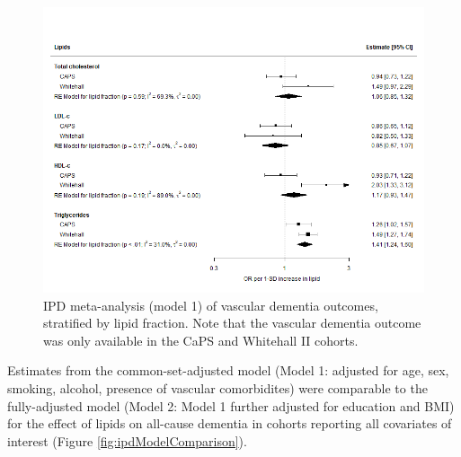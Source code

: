\documentclass[a4paper, twoside]{templates/ociamthesis}
\begin{document}
\begin{figure}[H]
\includegraphics[width=1\linewidth]{figures/ipd/main_vasdem} \caption[IPD meta-analysis of all-cause dementia, stratified by lipid fraction]{IPD meta-analysis (model 1) of vascular dementia outcomes, stratified by lipid fraction. Note that the vascular dementia outcome was only available in the CaPS and Whitehall II cohorts.}\label{fig:mainEffectVad}
\end{figure}

Estimates from the common-set-adjusted model (Model 1: adjusted for age, sex, smoking, alcohol, presence of vascular comorbidites) were comparable to the fully-adjusted model (Model 2: Model 1 further adjusted for education and BMI) for the effect of lipids on all-cause dementia in cohorts reporting all covariates of interest (Figure \ref{fig:ipdModelComparison}).
\end{document}
